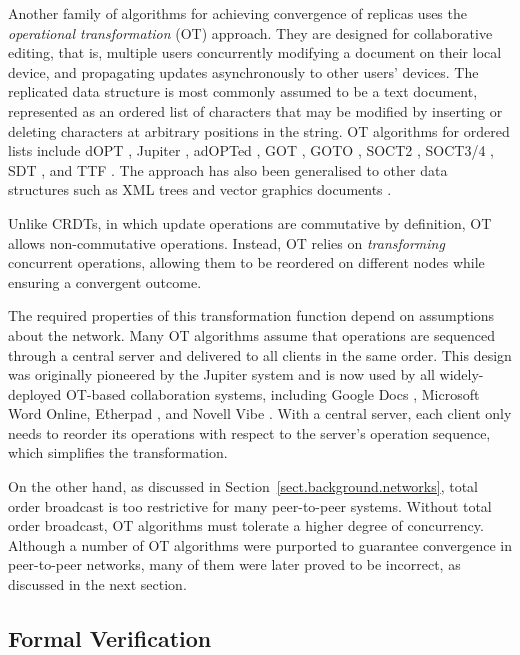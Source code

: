 Another family of algorithms for achieving convergence of replicas uses the \emph{operational
transformation} (OT) approach. They are designed for collaborative editing, that is, multiple users
concurrently modifying a document on their local device, and propagating updates asynchronously to
other users' devices. The replicated data structure is most commonly assumed to be a text document,
represented as an ordered list of characters that may be modified by inserting or deleting
characters at arbitrary positions in the string. OT algorithms for ordered lists include
dOPT \cite{Ellis:1989ue}, Jupiter \cite{Nichols:1995fd}, adOPTed \cite{Ressel:1996wx},
GOT \cite{Sun:1998un}, GOTO \cite{Sun:1998vf}, SOCT2 \cite{Suleiman:1997gl,Suleiman:1998eu},
SOCT3/4 \cite{Vidot:2000ch}, SDT \cite{Li:2004er,Li:2008hw}, and TTF \cite{Oster:2006tr}.
The approach has also been generalised to other data structures such as XML trees
\cite{Ignat:2003jy,Davis:2002iv,Jungnickel:2015ua} and vector graphics documents
\cite{Sun:2002jb}.

Unlike CRDTs, in which update operations are commutative by definition, OT allows non-commutative
operations. Instead, OT relies on \emph{transforming} concurrent operations, allowing them to be
reordered on different nodes while ensuring a convergent outcome.

The required properties of this transformation function depend on assumptions about the network.
Many OT algorithms assume that operations are sequenced through a central server and delivered to
all clients in the same order. This design was originally pioneered by the Jupiter system
\cite{Nichols:1995fd} and is now used by all widely-deployed OT-based collaboration systems,
including Google Docs \cite{DayRichter:2010tt}, Microsoft Word Online, Etherpad
\cite{Etherpad:2011um}, and Novell Vibe \cite{Spiewak:2010vw}. With a central server, each client
only needs to reorder its operations with respect to the server's operation sequence, which
simplifies the transformation.

On the other hand, as discussed in Section~\ref{sect.background.networks}, total order broadcast is
too restrictive for many peer-to-peer systems. Without total order broadcast, OT algorithms must
tolerate a higher degree of concurrency. Although a number of OT algorithms were purported to
guarantee convergence in peer-to-peer networks, many of them were later proved to be incorrect, as
discussed in the next section.

\subsection{Formal Verification}\label{sect.related.verification}

